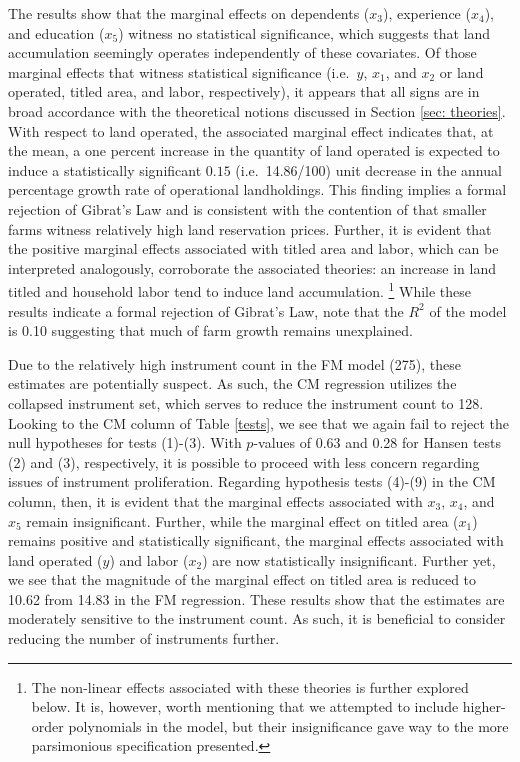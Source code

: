 \documentclass[english]{article}
\begin{document}
The results show that the marginal effects on dependents ($x_3$), 
experience ($x_4$), and education ($x_5$) witness no statistical significance, 
which suggests that land accumulation seemingly operates independently of 
these covariates.
Of those marginal effects that witness statistical significance (i.e.\ $y$, $x_1$, 
and $x_2$ or land operated, titled area, and labor, respectively), it appears that 
all signs are in broad accordance with the theoretical notions discussed in 
Section \ref{sec: theories}.
With respect to land operated, the associated marginal effect indicates that, at
the mean, a one percent increase in the quantity of land operated is expected to 
induce a statistically significant $0.15$ (i.e.\ 14.86/100) unit decrease in the 
annual percentage growth rate of operational landholdings. 
This finding implies a formal rejection of Gibrat's Law and is consistent with 
the contention of \citet{carter1993} that smaller farms witness relatively 
high land reservation prices.
Further, it is evident that the positive marginal effects associated with titled 
area and labor, which can be interpreted analogously, corroborate the 
associated theories: an increase in land titled and household labor tend to 
induce land accumulation.%
\footnote{The non-linear effects associated with these theories is further 
explored below. 
It is, however, worth mentioning that we attempted to include higher-order
polynomials in the model, but their insignificance gave way to the more 
parsimonious specification presented.}
While these results indicate a formal rejection of Gibrat's Law, note that the 
$R^2$ of the model is 0.10 suggesting that much of farm growth remains 
unexplained.

Due to the relatively high instrument count in the FM model (275), these
estimates are potentially suspect.
As such, the CM regression utilizes the collapsed instrument set, which
serves to reduce the instrument count to 128.
Looking to the CM column of Table \ref{tests}, we see that we again fail
to reject the null hypotheses for tests (1)-(3).
With $p$-values of 0.63 and 0.28 for Hansen tests (2) and (3), respectively, 
it is possible to proceed with less concern regarding issues of instrument 
proliferation.
Regarding hypothesis tests (4)-(9) in the CM column, then, it is evident that
the marginal effects associated with $x_3$, $x_4$, and $x_5$ remain 
insignificant.
Further, while the marginal effect on titled area ($x_1$) remains positive
and statistically significant, the marginal effects associated with land operated
($y$) and labor ($x_2$) are now statistically insignificant.
Further yet, we see that the magnitude of the marginal effect on titled area
is reduced to 10.62 from 14.83 in the FM regression.
These results show that the estimates are moderately sensitive to the 
instrument count.
As such, it is beneficial to consider reducing the number of instruments 
further.
\end{document}

